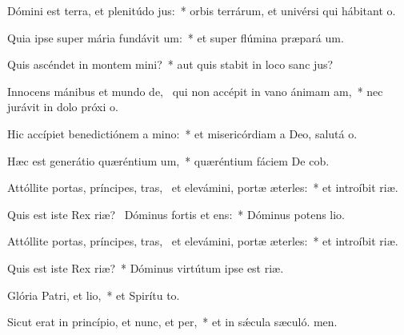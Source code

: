 \item Dómini est terra, et plenitúdo jus:~* orbis terrárum, et univérsi qui hábitant  o.
\item Quia ipse super mária fundávit um:~* et super flúmina præpará um.
\item Quis ascéndet in montem mini?~* aut quis stabit in loco sanc jus?
\item Innocens mánibus et mundo de,~\pscross{} qui non accépit in vano ánimam am,~* nec jurávit in dolo próxi o.
\item Hic accípiet benedictiónem a mino:~* et misericórdiam a Deo, salutá o.
\item Hæc est generátio quæréntium um,~* quæréntium fáciem De cob.
\item Attóllite portas, príncipes, tras,~\pscross{} et elevámini, portæ æterles:~* et introíbit  riæ.
\item Quis est iste Rex riæ?~\pscross{} Dóminus fortis et ens:~* Dóminus potens  lio.
\item Attóllite portas, príncipes, tras,~\pscross{} et elevámini, portæ æterles:~* et introíbit  riæ.
\item Quis est iste Rex riæ?~* Dóminus virtútum ipse est  riæ.
\item Glória Patri, et lio,~* et Spirítu to.
\item Sicut erat in princípio, et nunc, et per,~* et in sǽcula sæculó. men.
